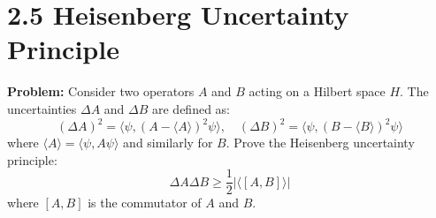 \documentclass{article}
\numberwithin{equation}{section}
\begin{document}
\section*{2.5 Heisenberg Uncertainty Principle}

\textbf{Problem:}  
Consider two operators \( A \) and \( B \) acting on a Hilbert space \( H \). The uncertainties \( \Delta A \) and \( \Delta B \) are defined as:
\[
(\Delta A)^2 = \langle \psi, (A - \langle A \rangle)^2 \psi \rangle, \quad (\Delta B)^2 = \langle \psi, (B - \langle B \rangle)^2 \psi \rangle
\]
where \( \langle A \rangle = \langle \psi, A \psi \rangle \) and similarly for \( B \). Prove the Heisenberg uncertainty principle:
\[
\Delta A \Delta B \geq \frac{1}{2} | \langle [A, B] \rangle |
\]
where \( [A, B] \) is the commutator of \( A \) and \( B \).
\end{document}
